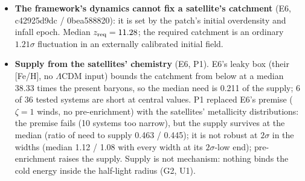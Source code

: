 \documentclass[10pt]{article}
\begin{document}
\begin{itemize}
\item \textbf{The framework's dynamics cannot fix a satellite's catchment} (E6, c42925d9dc / 0bea588820): it is set by the patch's initial overdensity and infall epoch. Median $z_{\rm req}=11.28$; the required catchment is an ordinary $1.21\sigma$ fluctuation in an externally calibrated initial field.
\item \textbf{Supply from the satellites' chemistry} (E6, P1). E6's leaky box (their [Fe/H], no $\Lambda$CDM input) bounds the catchment from below at a median 38.33 times the present baryons, so the median need is 0.211 of the supply; 6 of 36 tested systems are short at central values. P1 replaced E6's premise ($\zeta=1$ winds, no pre-enrichment) with the satellites' metallicity distributions: the premise fails (10 systems too narrow), but the supply survives at the median (ratio of need to supply 0.463 / 0.445); it is not robust at $2\sigma$ in the widths (median 1.12 / 1.08 with every width at its $2\sigma$-low end); pre-enrichment raises the supply. Supply is not mechanism: nothing binds the cold energy inside the half-light radius (G2, U1).
\end{itemize}
\end{document}
